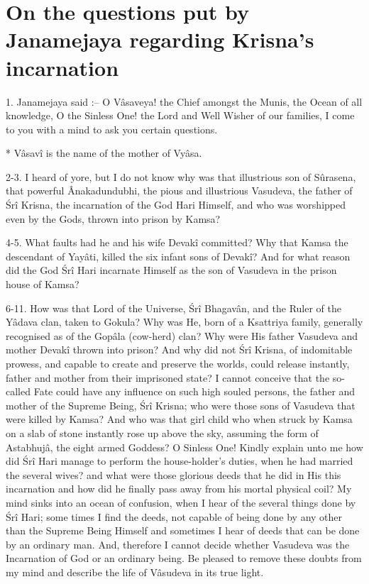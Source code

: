 ﻿\chapter{On the questions put by Janamejaya regarding Krisna's incarnation}

1. Janamejaya said :-- O V\^asaveya! the Chief amongst the Munis, the Ocean of all knowledge, O the Sinless One! the Lord and Well Wisher of our families, I come to you with a mind to ask you certain questions.

* V\^asav\^i is the name of the mother of Vy\^asa.

2-3. I heard of yore, but I do not know why was that illustrious son of Sûrasena, that powerful \^Anakadundubhi\footnotemark, the pious and illustrious Vasudeva, the father of \'Sr\^i Krisna, the incarnation of the God Hari Himself, and who was worshipped even by the Gods, thrown into prison by Kamsa?


4-5. What faults had he and his wife Devak\^i committed? Why that Kamsa the descendant of Yay\^ati, killed the six infant sons of Devak\^i? And for what reason did the God \'Sr\^i Hari incarnate Himself as the son of Vasudeva in the prison house of Kamsa?

6-11. How was that Lord of the Universe, \'Sr\^i Bhagav\^an, and the Ruler of the Y\^adava clan, taken to Gokula? Why was He, born of a Ksattriya family, generally recognised as of the Gop\^ala (cow-herd) clan? Why were His father Vasudeva and mother Devak\^i thrown into prison? And why did not \'Sr\^i Krisna, of indomitable prowess, and capable to create and preserve the worlds, could release instantly, father and mother from their imprisoned state? I cannot conceive that the so-called Fate could have any influence on such high souled persons, the father and mother of the Supreme Being, \'Sr\^i Krisna; who were those sons of Vasudeva that were killed by Kamsa? And who was that girl child who when struck by Kamsa on a slab of stone instantly rose up above the sky, assuming the form of Astabhuj\^a, the eight armed Goddess? O Sinless One! Kindly explain unto me how did \'Sr\^i Hari manage to perform the house-holder's duties, when he had married the several wives? and what were those glorious deeds that he did in His this incarnation and how did he finally pass away from his mortal physical coil? My mind sinks into an ocean of confusion, when I hear of the several things done by \'Sr\^i Hari; some times I find the deeds, not capable of being done by any other than the Supreme Being Himself and sometimes I hear of deeds that can be done by  an ordinary man. And, therefore I cannot decide whether Vasudeva was the Incarnation of God or an ordinary being. Be pleased to remove these doubts from my mind and describe the life of V\^asudeva in its true light.

